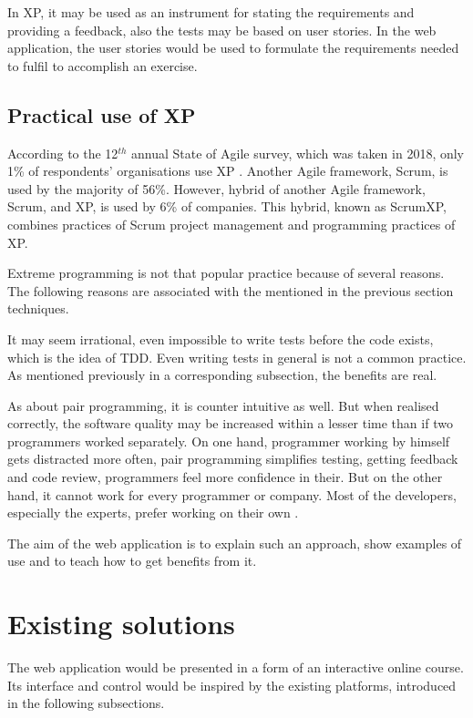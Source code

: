In XP, it may be used as an instrument for stating the requirements and providing a feedback, also the tests may be based on user stories. In the web application, the user stories would be used to formulate the requirements needed to fulfil to accomplish an exercise.

\subsection{Practical use of XP}
According to the 12$^{th}$ annual State of Agile survey, which was taken in 2018, only 1\% of respondents' organisations use XP \cite{agile_survey}. Another Agile framework, Scrum, is used by the majority of 56\%. However, hybrid of another Agile framework, Scrum, and XP, is used by 6\% of companies. This hybrid, known as ScrumXP, combines practices of Scrum project management and programming practices of XP.

Extreme programming is not that popular practice because of several reasons. The following reasons are associated with the mentioned in the previous section techniques.

It may seem irrational, even impossible to write tests before the code exists, which is the idea of TDD. Even writing tests in general is not a common practice. As mentioned previously in a corresponding subsection, the benefits are real.

As about pair programming, it is counter intuitive as well. But when realised correctly, the software quality may be increased within a lesser time than if two programmers worked separately. On one hand, programmer working by himself gets distracted more often, pair programming simplifies testing, getting feedback and code review, programmers feel more confidence in their. But on the other hand, it cannot work for every programmer or company. Most of the developers, especially the experts, prefer working on their own \cite[Two by Two]{xp_howto}.

The aim of the web application is to explain such an approach, show examples of use and to teach how to get benefits from it.


\section{Existing solutions}
The web application would be presented in a form of an interactive online course. Its interface and control would be inspired by the existing platforms, introduced in the following subsections.

